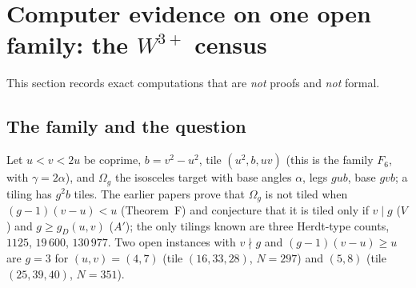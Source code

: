 \documentclass[11pt,reqno]{amsart}
\theoremstyle{plain}
\theoremstyle{definition}
\begin{document}
\section{Computer evidence on one open family: the $W^{3+}$ census}\label{app:w3}
This section records exact computations that are \emph{not} proofs and \emph{not} formal.
\subsection{The family and the question}
Let $u<v<2u$ be coprime, $b=v^2-u^2$, tile $(u^2,b,uv)$ (this is the family $F_6$, with $\gamma=2\alpha$), and $\Omega_g$ the isosceles target with base angles $\alpha$, legs $gub$, base $gvb$; a tiling has $g^2b$ tiles.
The earlier papers prove that $\Omega_g$ is not tiled when $(g-1)(v-u)<u$ (Theorem~F) and conjecture that it is tiled only if $v\mid g$ ($V$) and $g\ge g_D(u,v)$ ($A'$); the only tilings known are three Herdt-type counts, $1125$, $19\,600$, $130\,977$.
Two open instances with $v\nmid g$ and $(g-1)(v-u)\ge u$ are $g=3$ for $(u,v)=(4,7)$ (tile $(16,33,28)$, $N=297$) and $(5,8)$ (tile $(25,39,40)$, $N=351$).
\end{document}
